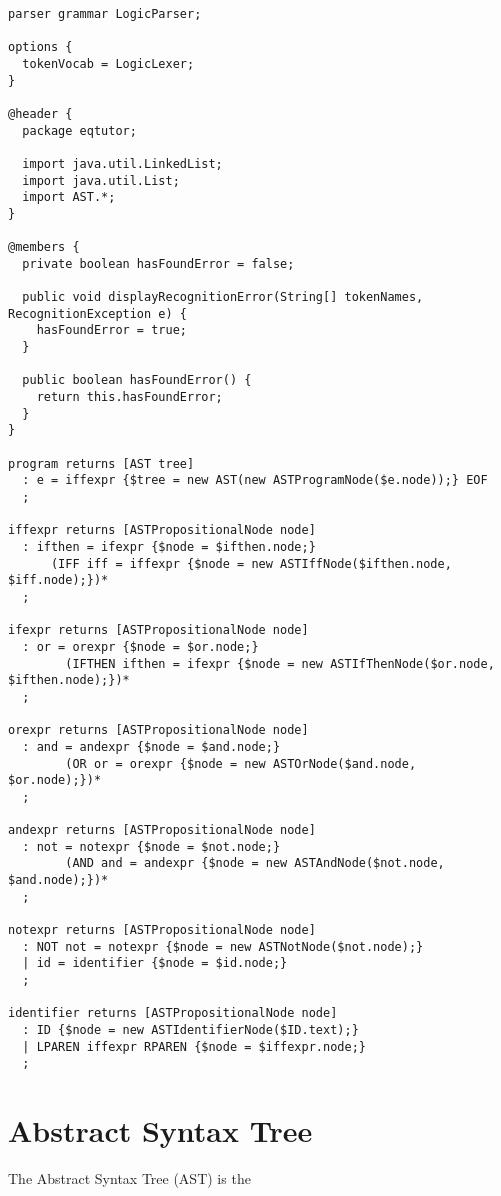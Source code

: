 \documentclass{report}
\begin{document}
\begin{verbatim}
parser grammar LogicParser;

options {
  tokenVocab = LogicLexer;
}

@header {
  package eqtutor;

  import java.util.LinkedList;
  import java.util.List;
  import AST.*;
}

@members {
  private boolean hasFoundError = false;

  public void displayRecognitionError(String[] tokenNames, RecognitionException e) {
    hasFoundError = true;
  }

  public boolean hasFoundError() {
    return this.hasFoundError;
  }
}

program returns [AST tree]
  : e = iffexpr {$tree = new AST(new ASTProgramNode($e.node));} EOF
  ;

iffexpr returns [ASTPropositionalNode node]
  : ifthen = ifexpr {$node = $ifthen.node;} 
	  (IFF iff = iffexpr {$node = new ASTIffNode($ifthen.node, $iff.node);})*
  ;
  	
ifexpr returns [ASTPropositionalNode node]
  : or = orexpr {$node = $or.node;} 
		(IFTHEN ifthen = ifexpr {$node = new ASTIfThenNode($or.node, $ifthen.node);})*
  ;

orexpr returns [ASTPropositionalNode node]
  : and = andexpr {$node = $and.node;} 
		(OR or = orexpr {$node = new ASTOrNode($and.node, $or.node);})*
  ;

andexpr returns [ASTPropositionalNode node]
  : not = notexpr {$node = $not.node;} 
		(AND and = andexpr {$node = new ASTAndNode($not.node, $and.node);})*
  ;

notexpr returns [ASTPropositionalNode node]
  : NOT not = notexpr {$node = new ASTNotNode($not.node);}
  | id = identifier {$node = $id.node;}
  ;

identifier returns [ASTPropositionalNode node]
  : ID {$node = new ASTIdentifierNode($ID.text);}
  | LPAREN iffexpr RPAREN {$node = $iffexpr.node;}
  ;
\end{verbatim}

\section{Abstract Syntax Tree}

The Abstract Syntax Tree (AST) is the

\end{document}
